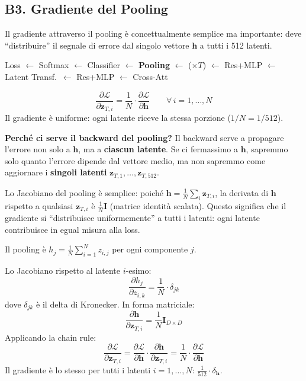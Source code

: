 \documentclass[12pt,a4paper]{article}
\begin{document}
\subsection{B3. Gradiente del Pooling} \label{sec:grad_pool}

Il gradiente attraverso il pooling \`e concettualmente semplice ma importante: deve ``distribuire'' il segnale di errore dal singolo vettore $\mathbf{h}$ a tutti i 512 latenti.

\begin{pipelinebox}[title={\small Backward --- Passo corrente evidenziato}]
Loss $\leftarrow$ Softmax $\leftarrow$ Classifier $\leftarrow$ \textbf{Pooling} $\leftarrow$ ($\times T$) $\leftarrow$ Res+MLP $\leftarrow$ Latent Transf.\ $\leftarrow$ Res+MLP $\leftarrow$ Cross-Att
\end{pipelinebox}

\begin{formulabox}
\[
    \frac{\partial \mathcal{L}}{\partial \mathbf{z}_{T,i}} = \frac{1}{N} \cdot \frac{\partial \mathcal{L}}{\partial \mathbf{h}} \qquad \forall\, i = 1, \ldots, N
\]
Il gradiente \`e uniforme: ogni latente riceve la stessa porzione ($1/N = 1/512$).
\end{formulabox}

\textbf{Perch\'e ci serve il backward del pooling?} Il backward serve a propagare l'errore non solo a $\mathbf{h}$, ma a \textbf{ciascun latente}. Se ci fermassimo a $\mathbf{h}$, sapremmo solo quanto l'errore dipende dal vettore medio, ma non sapremmo come aggiornare i \textbf{singoli latenti} $\mathbf{z}_{T,1}, \ldots, \mathbf{z}_{T,512}$.

Lo Jacobiano del pooling \`e semplice: poich\'e $\mathbf{h} = \frac{1}{N}\sum_i \mathbf{z}_{T,i}$, la derivata di $\mathbf{h}$ rispetto a qualsiasi $\mathbf{z}_{T,i}$ \`e $\frac{1}{N} \mathbf{I}$ (matrice identit\`a scalata). Questo significa che il gradiente si ``distribuisce uniformemente'' a tutti i latenti: ogni latente contribuisce in egual misura alla loss.

\begin{proofbox}
Il pooling \`e $h_j = \frac{1}{N} \sum_{i=1}^{N} z_{i,j}$ per ogni componente $j$.

Lo Jacobiano rispetto al latente $i$-esimo:
\[
    \frac{\partial h_j}{\partial z_{i,k}} = \frac{1}{N} \cdot \delta_{jk}
\]
dove $\delta_{jk}$ \`e il delta di Kronecker. In forma matriciale:
\[
    \frac{\partial \mathbf{h}}{\partial \mathbf{z}_{T,i}} = \frac{1}{N} \mathbf{I}_{D \times D}
\]
Applicando la chain rule:
\[
    \frac{\partial \mathcal{L}}{\partial \mathbf{z}_{T,i}} = \frac{\partial \mathcal{L}}{\partial \mathbf{h}} \cdot \frac{\partial \mathbf{h}}{\partial \mathbf{z}_{T,i}} = \frac{1}{N} \cdot \frac{\partial \mathcal{L}}{\partial \mathbf{h}}
\]
Il gradiente \`e lo stesso per tutti i latenti $i = 1, \ldots, N$: $\frac{1}{512} \cdot \delta_{\mathbf{h}}$.
\end{proofbox}
\end{document}
